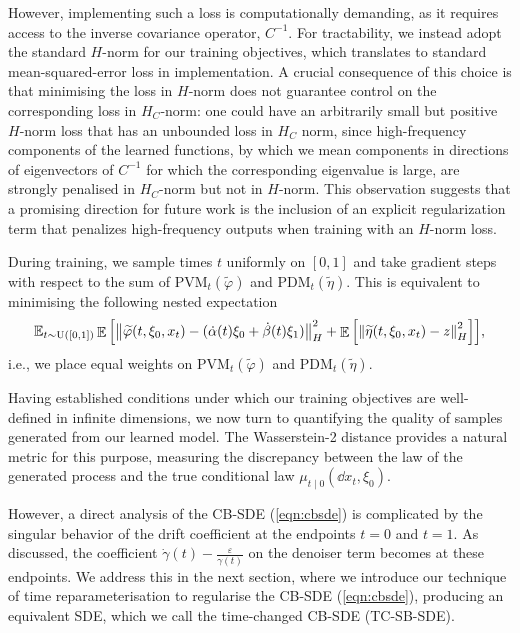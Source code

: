 However, implementing such a loss is computationally demanding, as it requires access to the inverse covariance operator, \(C^{-1}\). For tractability, we instead adopt the standard \(H\)-norm for our training objectives, which translates to standard mean-squared-error loss in implementation. A crucial consequence of this choice is that minimising the loss in \(H\)-norm does not guarantee control on the corresponding loss in \(H_{C}\)-norm: one could have an arbitrarily small but positive \(H\)-norm loss that has an unbounded loss in \(H_{C}\) norm, since  high-frequency components of the learned functions, by which we mean components in directions of eigenvectors of \(C^{-1}\) for which the corresponding eigenvalue is large, are strongly penalised in \(H_{C}\)-norm  but not in \(H\)-norm. This observation suggests that a promising direction for future work is the inclusion of an explicit regularization term that penalizes high-frequency outputs when training with an \(H\)-norm loss.

During training, we sample times \(t\) uniformly on \([0, 1]\) and take gradient steps with respect to the sum of \(\mathrm{PVM}_{t}(\widetilde{\varphi})\) and \(\mathrm{PDM}_{t}(\widetilde{\eta})\). This is equivalent to minimising the following nested expectation
\[
  \mathop{\mathbb{E}_{t \sim \operatorname{U}([0, 1])}} \mathop{\mathbb{E}}\qty[\norm{ \widetilde{\varphi}(t, \xi_{0}, x_{t}) - (\dot{\alpha}(t) \xi_{0} + \dot{\beta}(t) \xi_{1})}^{2}_{H}+ \mathop{\mathbb{E}}\qty[\norm{ \widetilde{\eta}(t, \xi_{0}, x_{t}) - z}^{2}_{H}]],
\]
i.e., we place equal weights on \(\mathrm{PVM}_{t}(\widetilde{\varphi})\) and \(\mathrm{PDM}_{t}(\widetilde{\eta})\).

Having established conditions under which our training objectives are well-defined in infinite dimensions, we now turn to quantifying the quality of samples generated from our learned model. The Wasserstein-2 distance provides a natural metric for this purpose, measuring the discrepancy between the law of the generated process and the true conditional law \(\mu_{t \mid 0}(\dd{x_{t}, \xi_{0}})\).

However, a direct analysis of the CB-SDE (\ref{eqn:cbsde}) is complicated by the singular behavior of the drift coefficient at the endpoints \(t=0\) and \(t=1\). As discussed, the coefficient \(\dot{\gamma}(t) - \frac{\varepsilon}{\gamma(t)}\) on the denoiser term becomes at these endpoints. We address this in the next section, where we introduce our technique of time reparameterisation to regularise the CB-SDE (\ref{eqn:cbsde}), producing an equivalent SDE, which we call the time-changed CB-SDE (TC-SB-SDE).

